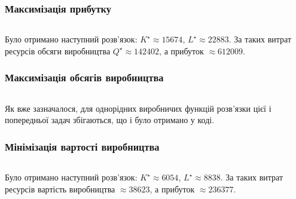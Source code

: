 \subsubsection{Максимізація прибутку}

\inputminted[firstline=56,lastline=73]{python}{labs/examples/4/py/all.py}

Було отримано наступний розв'язок: $K^\star \approx 15674$, $L^\star \approx 22883$. За таких витрат ресурсів обсяги виробництва $Q^\star \approx 142402$, а прибуток $\approx 612009$.

\subsubsection{Максимізація обсягів виробництва}

\inputminted[firstline=77,lastline=92]{python}{labs/examples/4/py/all.py}

Як вже зазначалося, для однорідних виробничих функцій розв'язки цієї і попередньої задач збігаються, що і було отримано у коді.

\subsubsection{Мінімізація вартості виробництва}

\inputminted[firstline=96,lastline=112]{python}{labs/examples/4/py/all.py}

Було отримано наступний розв'язок: $K^\star \approx 6054$, $L^\star \approx 8838$. За таких витрат ресурсів вартість виробництва $\approx 38623$, а прибуток $\approx 236377$.

